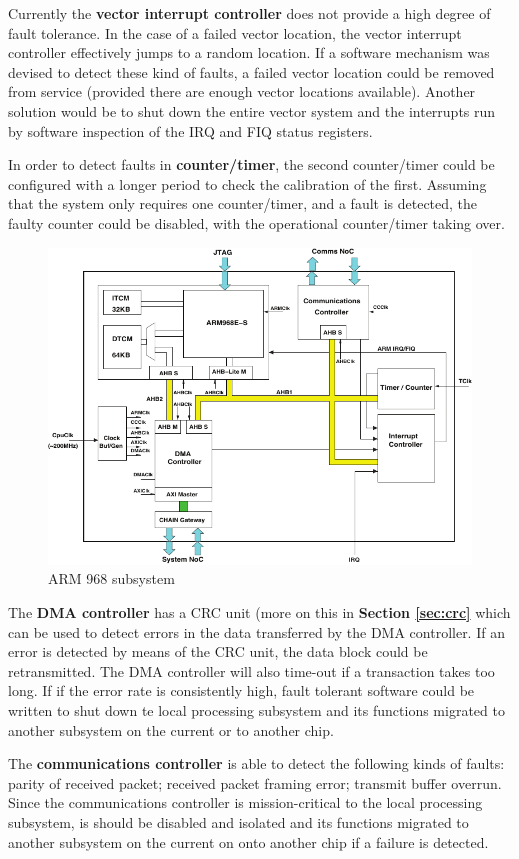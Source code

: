 \documentclass[a4paper, 11pt]{article}
\begin{document}
Currently the \textbf{vector interrupt controller} does not provide a high degree of fault tolerance. In the case of a failed vector location, the vector interrupt controller effectively jumps to a random location. If a software mechanism was devised to detect these kind of faults, a failed vector location could be removed from service (provided there are enough vector locations available). Another solution would be to shut down the entire vector system and the interrupts run by software inspection of the IRQ and FIQ status registers.

In order to detect faults in \textbf{counter/timer}, the second counter/timer could be configured with a longer period to check the calibration of the first. Assuming that the system only requires one counter/timer, and a fault is detected, the faulty counter could be disabled, with the operational counter/timer taking over.

\begin{figure}[htbp]
	\centering
	\includegraphics[width=0.7\linewidth]{images/arm968_subsystem.pdf}
	\caption{ARM 968 subsystem}
	\label{fig:arm968}
\end{figure}

The \textbf{DMA controller} has a CRC unit (more on this in \textbf{Section \ref{sec:crc}} which can be used to detect errors in the data transferred by the DMA controller. If an error is detected by means of the CRC unit, the data block could be retransmitted. The DMA controller will also time-out if a transaction takes too long. If if the error rate is consistently high, fault tolerant software could be written to shut down te local processing subsystem and its functions migrated to another subsystem on the current or to another chip.

The \textbf{communications controller} is able to detect the following kinds of faults:
parity of received packet; received packet framing error; transmit buffer overrun. Since the communications controller is mission-critical to the local processing subsystem, is should be disabled and isolated and its functions migrated to another subsystem on the current on onto another chip if a failure is detected.
\end{document}
